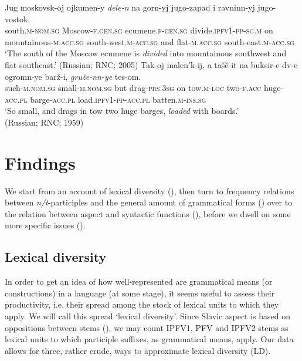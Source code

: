 \documentclass[output=paper]{langscibook}
\begin{document}
\ex\label{wiem:ex:divided}{ \gll
{Jug} {moskovsk-oj} {ojkumen-y} \textit{{dele-n}} {na} {gorn-yj} {jugo-zapad} {i} {ravninn-yj} {jugo-vostok}.\\
south.\textsc{m-nom.sg} Moscow-\textsc{f.gen.sg} ecumene.\textsc{f-gen.sg} divide.\textsc{ipfv1-pp-sg.m} on mountainous-\textsc{m.acc.sg} south-west.\textsc{m-acc.sg} and flat-\textsc{m.acc.sg} south-east.\textsc{m-acc.sg} \\
\glt ‘The south of the Moscow ecumene is \textit{divided} into mountainous southwest and flat southeast.’ \hfill (Russian; RNC; 2005)
}
\ex\label{wiem:ex:loaded-ru}{ \gll
{Tak-oj} {malen’k-ij}, {a} {tašč-it} {na} {buksir-e} {dv-e} {ogromn-ye} {barž-i}, \textit{gruže-nn-ye} {tes-om}.\\
such-\textsc{m.nom.sg} small-\textsc{m.nom.sg} but drag-\textsc{prs.3sg} on tow.\textsc{m-loc} two-\textsc{f.acc} huge-\textsc{acc.pl} barge-\textsc{acc.pl} load.\textsc{ipfv1-pp-acc.pl} batten.\textsc{m-ins.sg}\\
\glt ‘So small, and drags in tow two huge barges, \textit{loaded} with boards.’ \\
\hfill (Russian; RNC; 1959)
}
\z

\section{Findings}\label{wiem:sec:findings}

We start from an account of lexical diversity (), then turn to frequency relations between \textit{n/t}-participles and the general amount of grammatical forms () over to the relation between aspect and syntactic functions (), before we dwell on some more specific issues ().

\subsection{Lexical diversity}\label{wiem:sec:lex-diversity}

In order to get an idea of how well-represented are grammatical means (or constructions) in a language (at some stage), it seems useful to assess their productivity, i.e. their spread among the stock of lexical units to which they apply. We will call this spread ‘lexical diversity’. Since Slavic aspect is based on oppositions between stems (), we may count IPFV1, PFV and IPFV2 stems as lexical units to which participle suffixes, as grammatical means, apply. Our data allows for three, rather crude, ways to approximate lexical diversity (LD).
\end{document}
